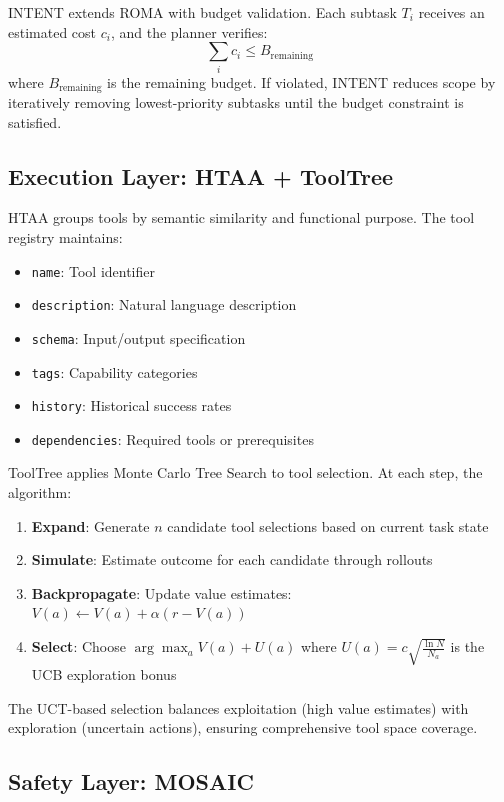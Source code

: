 \documentclass{article}
\begin{document}
INTENT extends ROMA with budget validation. Each subtask $T_i$ receives an estimated cost $c_i$, and the planner verifies:
\begin{equation}
\sum_{i} c_i \leq B_{\text{remaining}}
\end{equation}
where $B_{\text{remaining}}$ is the remaining budget. If violated, INTENT reduces scope by iteratively removing lowest-priority subtasks until the budget constraint is satisfied.

\subsection{Execution Layer: HTAA + ToolTree}

HTAA groups tools by semantic similarity and functional purpose. The tool registry maintains:
\begin{itemize}
    \item \texttt{name}: Tool identifier
    \item \texttt{description}: Natural language description
    \item \texttt{schema}: Input/output specification
    \item \texttt{tags}: Capability categories
    \item \texttt{history}: Historical success rates
    \item \texttt{dependencies}: Required tools or prerequisites
\end{itemize}

ToolTree applies Monte Carlo Tree Search to tool selection. At each step, the algorithm:
\begin{enumerate}
    \item \textbf{Expand}: Generate $n$ candidate tool selections based on current task state
    \item \textbf{Simulate}: Estimate outcome for each candidate through rollouts
    \item \textbf{Backpropagate}: Update value estimates: $V(a) \leftarrow V(a) + \alpha(r - V(a))$
    \item \textbf{Select}: Choose $\arg\max_a V(a) + U(a)$ where $U(a) = c\sqrt{\frac{\ln N}{N_a}}$ is the UCB exploration bonus
\end{enumerate}
The UCT-based selection balances exploitation (high value estimates) with exploration (uncertain actions), ensuring comprehensive tool space coverage.

\subsection{Safety Layer: MOSAIC}
\end{document}
